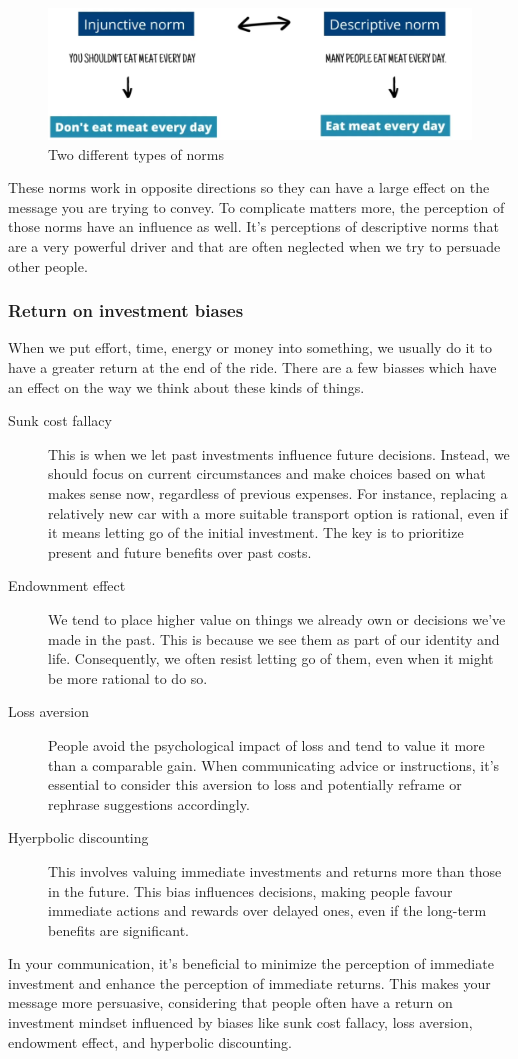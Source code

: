 \documentclass[../summary.tex]{subfiles}
\begin{document}
				\begin{figure}[h]
					\centering
					\includegraphics[width=0.7\linewidth]{../images/12-norm.png}
					\caption{Two different types of norms}
					\label{fig:12-norm}
				\end{figure}
				These norms work in opposite directions so they can have a large effect on the message you are trying to convey. To complicate matters more, the perception of those norms have an influence as well. It's perceptions of descriptive norms that are a very powerful driver and that are often neglected when we try to persuade other people.
				
			\subsubsection{Return on investment biases}
				When we put effort, time, energy or money into something, we usually do it to have a greater return at the end of the ride. There are a few biasses which have an effect on the way we think about these kinds of things. 
				\begin{description}
					\item[Sunk cost fallacy] This is when we let past investments influence future decisions. Instead, we should focus on current circumstances and make choices based on what makes sense now, regardless of previous expenses. For instance, replacing a relatively new car with a more suitable transport option is rational, even if it means letting go of the initial investment. The key is to prioritize present and future benefits over past costs.
					\item[Endownment effect] We tend to place higher value on things we already own or decisions we've made in the past. This is because we see them as part of our identity and life. Consequently, we often resist letting go of them, even when it might be more rational to do so.
					\item[Loss aversion] People avoid the psychological impact of loss and tend to value it more than a comparable gain. When communicating advice or instructions, it's essential to consider this aversion to loss and potentially reframe or rephrase suggestions accordingly.
					\item[Hyerpbolic discounting] This involves valuing immediate investments and returns more than those in the future. This bias influences decisions, making people favour immediate actions and rewards over delayed ones, even if the long-term benefits are significant.
				\end{description}
				In your communication, it's beneficial to minimize the perception of immediate investment and enhance the perception of immediate returns. This makes your message more persuasive, considering that people often have a return on investment mindset influenced by biases like sunk cost fallacy, loss aversion, endowment effect, and hyperbolic discounting.
			
\end{document}
